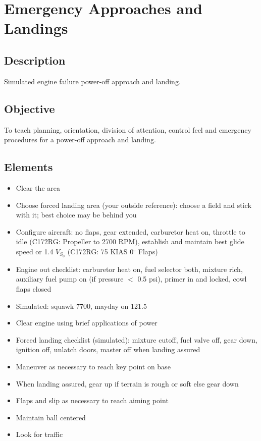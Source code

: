 \section{Emergency Approaches and Landings}

\subsection{Description}

Simulated engine failure power-off approach and landing.

\subsection{Objective}

To teach planning, orientation, division of attention, control feel and
emergency procedures for a power-off approach and landing.

\subsection{Elements}

\begin{itemize}
  \item Clear the area
  \item Choose forced landing area (your outside reference): choose a field and
    stick with it; best choice may be behind you
  \item Configure aircraft: no flaps, gear extended, carburetor heat on,
    throttle to idle (C172RG: Propeller to 2700 RPM), establish and maintain
    best glide speed or 1.4 $V_{S_0}$ (C172RG: 75 KIAS 0$^\circ$ Flaps)
  \item Engine out checklist: carburetor heat on, fuel selector both, mixture
    rich, auxiliary fuel pump on (if pressure $<$ 0.5 psi), primer in and locked,
    cowl flaps closed
  \item Simulated: squawk 7700, mayday on 121.5
  \item Clear engine using brief applications of power
  \item Forced landing checklist (simulated): mixture cutoff, fuel valve off,
    gear down, ignition off, unlatch doors, master off when landing assured
  \item Maneuver as necessary to reach key point on base
  \item When landing assured, gear up if terrain is rough or soft else gear
    down
  \item Flaps and slip as necessary to reach aiming point
  \item Maintain ball centered 
  \item Look for traffic
\end{itemize}


